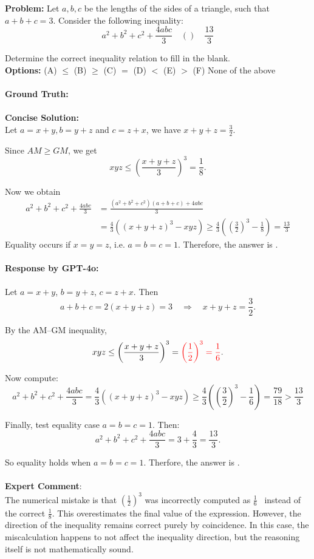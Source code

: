 \begin{examplebox}
\textbf{Problem:} Let $a, b, c$ be the lengths of the sides of a triangle, such that $a+b+c=3$. Consider the following inequality:
$$
a^{2}+b^{2}+c^{2}+\frac{4 a b c}{3} \quad () \quad \frac{13}{3}
$$

Determine the correct inequality relation to fill in the blank.\\
\textbf{Options:} (A) $\leq$ \quad(B) $\geq$ \quad (C) $=$  \quad (D) $<$ \quad  (E) $>$  \quad (F) None of the above
\\\\
\textbf{Ground Truth:} 
\\\\
\textbf{Concise Solution:} \\
Let $a=x+y, b=y+z$ and $c=z+x$, we have $x+y+z=\frac{3}{2}$.

Since $A M \geq G M$, we get \[x y z \leq\left(\frac{x+y+z}{3}\right)^{3}=\frac{1}{8}.\]

Now we obtain$$\begin{aligned}a^{2} +b^{2}+c^{2}+\frac{4 a b c}{3} &=\frac{\left(a^{2}+b^{2}+c^{2}\right)(a+b+c)+4 a b c}{3} \\& =\frac{4}{3}\left((x+y+z)^{3}-x y z\right) \geq \frac{4}{3}\left(\left(\frac{3}{2}\right)^{3}-\frac{1}{8}\right)=\frac{13}{3}\end{aligned}$$Equality occurs if $x=y=z$, i.e. $a=b=c=1$. Therefore, the answer is .
\\\\
\textbf{Response by GPT-4o:}
\\\\
Let \( a = x + y \), \( b = y + z \), \( c = z + x \). Then
\[
a + b + c = 2(x + y + z) = 3 \quad \Rightarrow \quad x + y + z = \frac{3}{2}.
\]

By the AM–GM inequality,
\[
xyz \leq \left( \frac{x + y + z}{3} \right)^3 = {\textcolor{red}{\left( \frac{1}{2} \right)^3 = \frac{1}{6}}}.
\]

Now compute:
\[
a^2 + b^2 + c^2 + \frac{4abc}{3}
= \frac{4}{3} \left( (x + y + z)^3 - xyz \right)\geq \frac{4}{3} \left( \left( \frac{3}{2} \right)^3 - \frac{1}{6} \right)
= \frac{79}{18} > \frac{13}{3}
\]

Finally, test equality case \( a = b = c = 1 \). Then:
\[
a^2 + b^2 + c^2 + \frac{4abc}{3} = 3 + \frac{4}{3} = \frac{13}{3}.
\]

So equality holds when \( a = b = c = 1 \). Therfore, the answer is .
\\\\
\textbf{Expert Comment}: \\
The numerical mistake is that $\left( \frac{1}{2} \right)^3$ was incorrectly computed as $\frac{1}{6}$ \wronghl~instead of the correct $\frac{1}{8}$. This overestimates the final value of the expression. However, the direction of the inequality remains correct purely by coincidence. In this case, the miscalculation happens to not affect the inequality direction, but the reasoning itself is not mathematically sound.

\end{examplebox}
